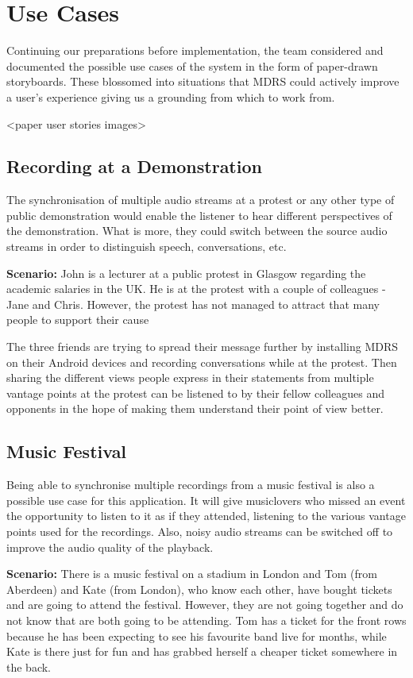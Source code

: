 \documentclass{l3proj}
\begin{document}
\section{Use Cases}
Continuing our preparations before implementation, the team considered and documented the possible use cases of the system in the form of paper-drawn storyboards. These blossomed into situations that MDRS could actively improve a user's experience giving us a grounding from which to work from.

<paper user stories images>

\subsection{Recording at a Demonstration} The synchronisation of multiple audio streams at a protest or any other type of public demonstration would enable the listener to hear different perspectives of the demonstration. What is more, they could switch between the source audio streams in order to distinguish speech, conversations, etc.

\textbf{Scenario:} John is a lecturer at a public protest in Glasgow regarding the academic salaries in the UK. He is at the protest with a couple of colleagues - Jane and Chris. However, the protest has not managed to attract that many people to support their cause

The three friends are trying to spread their message further by installing MDRS on their Android devices and recording conversations while at the protest. Then sharing the different views people express in their statements from multiple vantage points at the protest can be listened to by their fellow colleagues and opponents in the hope of making them understand their point of view better.

\subsection{Music Festival} Being able to synchronise multiple recordings from a music festival is also a possible use case for this application. It will give musiclovers who missed an event the opportunity to listen to it as if they attended, listening to the various vantage points used for the recordings. Also, noisy audio streams can be switched off to improve the audio quality of the playback.

\textbf{Scenario:} There is a music festival on a stadium in London and Tom (from Aberdeen) and Kate (from London), who know each other, have bought tickets and are going to attend the festival. However, they are not going together and do not know that are both going to be attending. Tom has a ticket for the front rows because he has been expecting to see his favourite band live for months, while Kate is there just for fun and has grabbed herself a cheaper ticket somewhere in the back.
\end{document}
